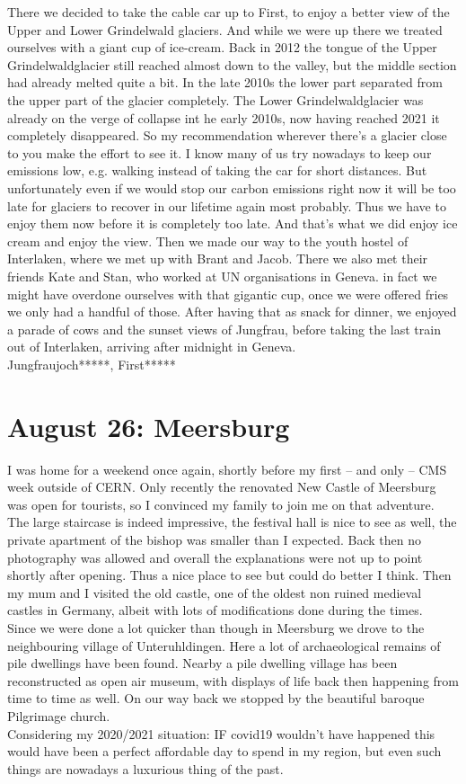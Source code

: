 There we decided to take the cable car up to First, to enjoy a better view of the Upper and Lower Grindelwald glaciers. And while we were up there we treated ourselves with a giant cup of ice-cream. Back in 2012 the tongue of the Upper Grindelwaldglacier still reached almost down to the valley, but the middle section had already melted quite a bit. In the late 2010s the lower part separated from the upper part of the glacier completely. The Lower Grindelwaldglacier was already on the verge of collapse int he early 2010s, now having reached 2021 it completely disappeared. So my recommendation wherever there's a glacier close to you make the effort to see it. I know many of us try nowadays to keep our emissions low, e.g. walking instead of taking the car for short distances. But unfortunately even if we would stop our carbon emissions right now it will be too late for glaciers to recover in our lifetime again most probably. Thus we have to enjoy them now before it is completely too late. And that's what we did enjoy ice cream and enjoy the view. Then we made our way to the youth hostel of Interlaken, where we met up with Brant and Jacob. There we also met their friends Kate and Stan, who worked at UN organisations in Geneva. in fact we might have overdone ourselves with that gigantic cup, once we were offered fries we only had a handful of those. After having that as snack for dinner, we enjoyed a parade of cows and the sunset views of Jungfrau, before taking the last train out of Interlaken, arriving after midnight in Geneva.\\

Jungfraujoch*****, First*****

\section{August 26: Meersburg}
\label{Meersburg2018}

I was home for a weekend once again, shortly before my first -- and only -- CMS week outside of CERN. Only recently the renovated New Castle of Meersburg was open for tourists, so I convinced my family to join me on that adventure. The large staircase is indeed impressive, the festival hall is nice to see as well, the private apartment of the bishop was smaller than I expected. Back then no photography was allowed and overall the explanations were not up to point shortly after opening. Thus a nice place to see but could do better I think. Then my mum and I visited the old castle, one of the oldest non ruined medieval castles in Germany, albeit with lots of modifications done during the times.\\
Since we were done a lot quicker than though in Meersburg we drove to the neighbouring village of Unteruhldingen. Here a lot of archaeological remains of pile dwellings have been found. Nearby a pile dwelling village has been reconstructed as open air museum, with displays of life back then happening from time to time as well. On our way back we stopped by the beautiful baroque Pilgrimage church.\\
Considering my 2020/2021 situation: IF covid19 wouldn't have happened this would have been a perfect affordable day to spend in my region, but even such things are nowadays a luxurious thing of the past.


